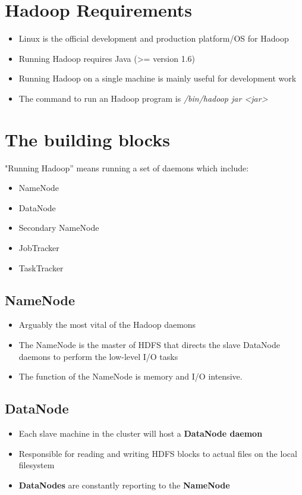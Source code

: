 \documentclass{article}
\begin{document}
\begin{multicols}{2}
\section{Hadoop Requirements}
\begin{itemize}
\item Linux is the official development and production platform/OS for Hadoop
\item Running Hadoop requires Java (>= version 1.6)
\item Running Hadoop on a single machine is mainly useful for development work
\item The command to run an Hadoop program is \emph{/bin/hadoop jar <jar>}
\end{itemize}

\newpage
\pagebreak

\section{The building blocks}

"Running Hadoop” means running a set of daemons which include:
\begin{itemize}
\item NameNode
\item DataNode
\item Secondary NameNode
\item JobTracker
\item TaskTracker
\end{itemize}

\subsection {NameNode}
\begin{itemize}
\item Arguably the most vital of the Hadoop daemons
\item The NameNode is the master of HDFS that directs the slave DataNode daemons to perform the low-level I/O tasks
\item The function of the NameNode is memory and I/O intensive.
\end{itemize}

\subsection {DataNode}
\begin{itemize}
\item Each slave machine in the cluster will host a \textbf{DataNode daemon}
\item Responsible for reading and writing HDFS blocks to actual files on the local filesystem
\item \textbf{DataNodes} are constantly reporting to the \textbf{NameNode}
\end{itemize}


\end{multicols}
\end{document}
